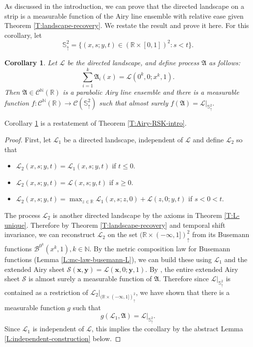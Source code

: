 \documentclass[11pt]{article}
\newcommand{\N}{\mathbb{N}}
\newcommand{\R}{\mathbb{R}}
\newcommand{\cB}{\mathcal{B}}
\newcommand{\cC}{\mathcal{C}}
\newcommand{\cL}{\mathcal{L}}
\newcommand{\cS}{\mathcal{S}}
\newcommand{\X}{\times}
\newcommand{\bx}{\mathbf{x}}
\newcommand{\by}{\mathbf{y}}
\newtheorem{corollary}[theorem]{Corollary}
\theoremstyle{definition} %
\theoremstyle{remark} %
\begin{document}
As discussed in the introduction, we can prove that the directed landscape on a strip is a measurable function of the Airy line ensemble with relative ease given Theorem \ref{T:landscape-recovery}. We restate the result and prove it here. For this corollary, let
$$
\mathbb S^2_\uparrow = \{(x, s; y, t) \in (\R \X [0, 1])^2 : s < t\}.
$$

\begin{corollary}
	\label{C:strip-reconstruction}
	Let $\cL$ be the directed landscape, and define process $\mathfrak A$ as follows:
	$$
	\sum_{i=1}^k \mathfrak A_i(x) = \cL(0^k, 0; x^k, 1).
	$$
	Then $\mathfrak A \in \cC^\N(\R)$ is a parabolic Airy line ensemble and there is a measurable function $f:\cC^\N(\R) \to \cC(\mathbb S^2_\uparrow)$ such that almost surely
	$
	f(\mathfrak A) = \cL|_{\mathbb S^2_\uparrow}.
	$
\end{corollary}

Corollary \ref{C:strip-reconstruction} is a restatement of Theorem \ref{T:Airy-RSK-intro}.
\begin{proof}
First, let $\cL_1$ be a directed landscape, independent of $\cL$ and define $\cL_2$ so that
\begin{itemize}
	\item $\cL_2(x, s; y, t) = \cL_1(x, s; y, t)$ if $t \le 0$.
	\item $\cL_2(x, s; y, t) = \cL(x, s; y, t)$ if $s \ge 0$.
	\item $\cL_2(x, s; y, t) = \max_{z \in \R} \cL_1(x, s; z, 0) + \cL(z, 0; y, t)$ if $s < 0 < t$.
\end{itemize}
The process $\cL_2$ is another directed landscape by the axioms in Theorem \ref{T:L-unique}. Therefore by Theorem \ref{T:landscape-recovery} and temporal shift invariance, we can reconstruct $\cL_2$ on the set
$
(\R \X (-\infty, 1])^2_\uparrow
$
from its Busemann functions
$
\cB^{0^k}(x^k, 1), k \in \N.
$
By the metric composition law for Busemann functions (Lemma \ref{L:mc-law-busemann-L}), we can build these using $\cL_1$ and the extended Airy sheet $\cS(\bx, \by) = \cL(\bx, 0; \by, 1)$. By \cite[Theorem 1.3]{dauvergne2021disjoint}, the entire extended Airy sheet $\cS$ is almost surely a measurable function of $\mathfrak A$. Therefore since $\cL|_{\mathbb S^2_\uparrow}$ is contained as a restriction of $\cL_2|_{(\R \X (-\infty, 1])^2_\uparrow}$, we have shown that there is a measurable function $g$ such that 
$$
g(\cL_1, \mathfrak A) = \cL|_{\mathbb S^2_\uparrow}.
$$
Since $\cL_1$ is independent of $\cL$, this implies the corollary by the abstract Lemma \ref{L:independent-construction} below.
\end{proof}
\end{document}
